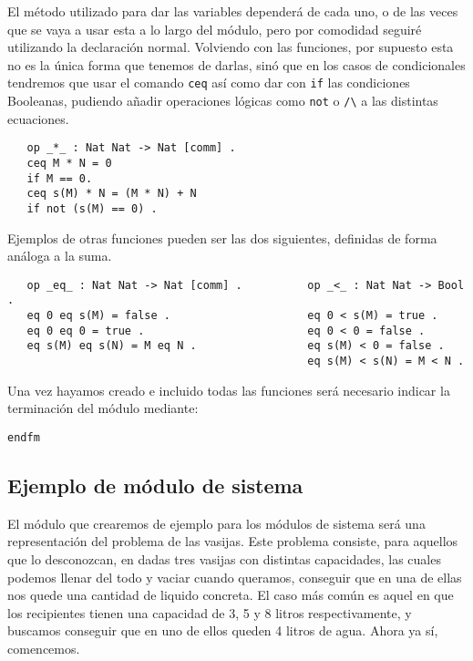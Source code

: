El método utilizado para dar las variables dependerá de cada uno, o de las veces que se vaya a usar esta a lo largo del módulo, pero por comodidad seguiré utilizando la declaración normal. Volviendo con las funciones, por supuesto esta no es la única forma que tenemos de darlas, sinó que en los casos de condicionales tendremos que usar el comando \texttt{ceq} así como dar con \texttt{if} las condiciones Booleanas, pudiendo añadir operaciones lógicas como \texttt{not} o \verb"/\" a las distintas ecuaciones.\par
{\codesize
\begin{verbatim}
   op _*_ : Nat Nat -> Nat [comm] .
   ceq M * N = 0 
   if M == 0.
   ceq s(M) * N = (M * N) + N
   if not (s(M) == 0) .
\end{verbatim}
}

Ejemplos de otras funciones pueden ser las dos siguientes, definidas de forma análoga a la suma.\par

{\codesize
\begin{verbatim}
   op _eq_ : Nat Nat -> Nat [comm] .          op _<_ : Nat Nat -> Bool .
   eq 0 eq s(M) = false .                     eq 0 < s(M) = true .
   eq 0 eq 0 = true .                         eq 0 < 0 = false .
   eq s(M) eq s(N) = M eq N .                 eq s(M) < 0 = false .
                                              eq s(M) < s(N) = M < N .	

\end{verbatim}
}

Una vez hayamos creado e incluido todas las funciones será necesario indicar la terminación del módulo mediante: \par

{\codesize
\begin{verbatim}
endfm
\end{verbatim}
}

\subsection{Ejemplo de módulo de sistema}

El módulo que crearemos de ejemplo para los módulos de sistema será una representación del problema de las vasijas. Este problema consiste, para aquellos que lo desconozcan, en dadas tres vasijas con distintas capacidades, las cuales podemos llenar del todo y vaciar cuando queramos, conseguir que en una de ellas nos quede una cantidad de liquido concreta. El caso más común es aquel en que los recipientes tienen una capacidad de 3, 5 y 8 litros respectivamente, y buscamos conseguir que en uno de ellos queden 4 litros de agua. Ahora ya sí, comencemos. \par

